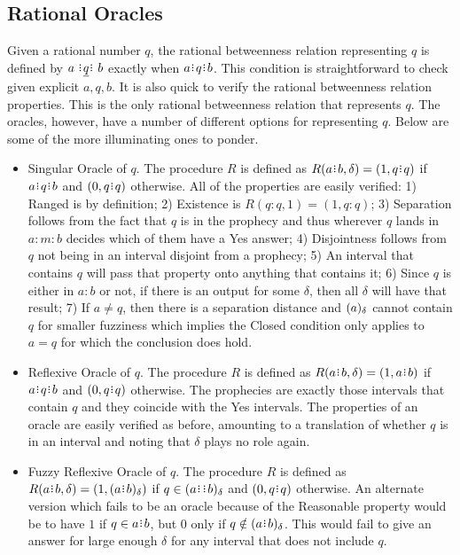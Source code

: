 \documentclass[12pt]{article}
\begin{document}
\subsection{Rational Oracles}

Given a rational number $q$, the rational betweenness relation representing $q$ is defined by $a \xrel[q] b$ exactly when $a \rint q \rint b$. This condition is straightforward to check given explicit $a, q, b$. It is also quick to verify the rational betweenness relation properties. This is the only rational betweenness relation that represents $q$. The oracles, however, have a number of different options for representing $q$. Below are some of the more illuminating ones to ponder. 

\begin{itemize}
    \item Singular Oracle of $q$. The procedure $R$ is defined as $R(a \rint b,\delta) = (1, q \rint q)$ if $a \rint q \rint b$ and $(0, q \rint q)$ otherwise. All of the properties are easily verified: 1) Ranged is by definition; 2) Existence is $R(q:q, 1) = (1, q:q)$; 3) Separation follows from the fact that $q$ is in the prophecy and thus wherever $q$ lands in $a:m:b$ decides which of them have a Yes answer; 4) Disjointness follows from $q$ not being in an interval disjoint from a prophecy; 5) An interval that contains $q$ will pass that property onto anything that contains it; 6) Since $q$ is either in $a:b$ or not, if there is an output for some $\delta$, then all $\delta$ will have that result; 7) If $a \neq q$, then there is a separation distance and $(a)_{\delta}$ cannot contain $q$ for smaller fuzziness which implies the Closed condition only applies to $a=q$ for which the conclusion does hold. 
    
    \item Reflexive Oracle of $q$. The procedure $R$ is defined as $R(a\rint b, \delta) = (1, a\rint b)$ if $a\rint q \rint b$ and $(0, q \rint q)$ otherwise. The prophecies are exactly those intervals that contain $q$ and they coincide with the Yes intervals. The properties of an oracle are easily verified as before, amounting to a translation of whether $q$ is in  an interval and noting that $\delta$ plays no role again.

    \item Fuzzy Reflexive Oracle of $q$. The procedure $R$ is defined as $R(a\rint b, \delta) = (1, \halo{a\rint b})$ if $q \in \halo{a\rint  \rint b}$ and $(0, q \rint q)$ otherwise. An alternate version which fails to be an oracle because of the Reasonable property would be to have $1$ if $q \in a \rint b$, but $0$ only if $q \notin \halo{a \rint b}$. This would fail to give an answer for large enough $\delta$ for any interval that does not include $q$. 
    

\end{itemize}
\end{document}

